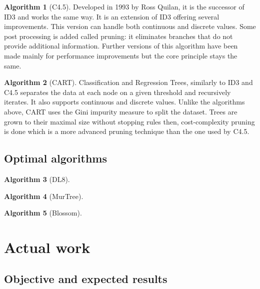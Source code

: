 \documentclass[12pt]{report}
\theoremstyle{definition}
\theoremstyle{definition}
\newtheorem*{algo}{Algorithm}
\theoremstyle{definition}
\begin{document}
\begin{algo}[C4.5]
    Developed in 1993 by Ross Quilan, it is the successor of ID3 and works the same way. It is an extension
    of ID3 offering several improvements. This version can handle both continuous and discrete values.
    Some post processing is added called pruning: it eliminates branches that do not provide additional
    information. Further versions of this algorithm have been made mainly for performance improvements but
    the core principle stays the same.
\end{algo}

\begin{algo}[CART]
    Classification and Regression Trees, similarly to ID3 and C4.5 separates the data at each node on a given
    threshold and recursively iterates. It also supports continuous and discrete values. Unlike the algorithms
    above, CART uses the Gini impurity measure to split the dataset. Trees are grown to their maximal size
    without stopping rules then, cost-complexity pruning is done which is a more advanced pruning technique
    than the one used by C4.5.
\end{algo}

\section{Optimal algorithms}
\begin{algo}[DL8]
\end {algo}

\begin{algo}[MurTree]
\end {algo}

\begin{algo}[Blossom]
\end {algo}


\chapter{Actual work}
\section{Objective and expected results} %
\end{document}
